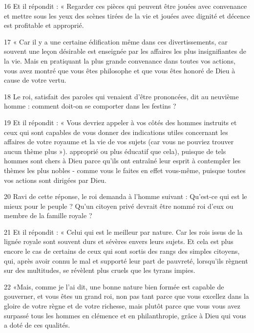 \par 16 Et il répondit : « Regarder ces pièces qui peuvent être jouées avec convenance et mettre sous les yeux des scènes tirées de la vie et jouées avec dignité et décence est profitable et approprié.

\par 17 « Car il y a une certaine édification même dans ces divertissements, car souvent une leçon désirable est enseignée par les affaires les plus insignifiantes de la vie. Mais en pratiquant la plus grande convenance dans toutes vos actions, vous avez montré que vous êtes philosophe et que vous êtes honoré de Dieu à cause de votre vertu.

\par 18 Le roi, satisfait des paroles qui venaient d'être prononcées, dit au neuvième homme : comment doit-on se comporter dans les festins ?

\par 19 Et il répondit : « Vous devriez appeler à vos côtés des hommes instruits et ceux qui sont capables de vous donner des indications utiles concernant les affaires de votre royaume et la vie de vos sujets (car vous ne pouviez trouver aucun thème plus »). approprié ou plus éducatif que cela), puisque de tels hommes sont chers à Dieu parce qu'ils ont entraîné leur esprit à contempler les thèmes les plus nobles - comme vous le faites en effet vous-même, puisque toutes vos actions sont dirigées par Dieu.

\par 20 Ravi de cette réponse, le roi demanda à l'homme suivant : Qu'est-ce qui est le mieux pour le peuple ? Qu'un citoyen privé devrait être nommé roi d'eux ou membre de la famille royale ?

\par 21 Et il répondit : « Celui qui est le meilleur par nature. Car les rois issus de la lignée royale sont souvent durs et sévères envers leurs sujets. Et cela est plus encore le cas de certains de ceux qui sont sortis des rangs des simples citoyens, qui, après avoir connu le mal et supporté leur part de pauvreté, lorsqu'ils règnent sur des multitudes, se révèlent plus cruels que les tyrans impies.

\par 22 «Mais, comme je l'ai dit, une bonne nature bien formée est capable de gouverner, et vous êtes un grand roi, non pas tant parce que vous excellez dans la gloire de votre règne et de votre richesse, mais plutôt parce que vous vous avez surpassé tous les hommes en clémence et en philanthropie, grâce à Dieu qui vous a doté de ces qualités.

